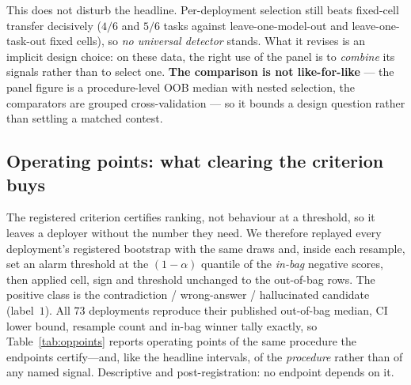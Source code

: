 \documentclass[11pt]{article}
\begin{document}
This does not disturb the headline. Per-deployment selection still beats
fixed-cell transfer decisively ($4/6$ and $5/6$ tasks against leave-one-model-out
and leave-one-task-out fixed cells), so \emph{no universal detector} stands.
What it revises is an implicit design choice: on these data, the right use of
the panel is to \emph{combine} its signals rather than to select one.
\textbf{The comparison is not like-for-like} --- the panel figure is a
procedure-level OOB median with nested selection, the comparators are grouped
cross-validation --- so it bounds a design question rather than settling a
matched contest.

\subsection{Operating points: what clearing the criterion buys}
\label{sec:oppoints}

The registered criterion certifies ranking, not behaviour at a threshold, so it leaves a deployer
without the number they need. We therefore replayed every deployment's registered bootstrap with the
same draws and, inside each resample, set an alarm threshold at the $(1-\alpha)$ quantile of the
\emph{in-bag} negative scores, then applied cell, sign and threshold unchanged to the out-of-bag
rows. The positive class is the contradiction / wrong-answer / hallucinated candidate (label~$1$).
All $73$ deployments reproduce their published out-of-bag median, CI lower bound, resample count and
in-bag winner tally exactly, so Table~\ref{tab:oppoints} reports operating points of the same
procedure the endpoints certify---and, like the headline intervals, of the \emph{procedure} rather
than of any named signal. Descriptive and post-registration: no endpoint depends on it.
\end{document}
